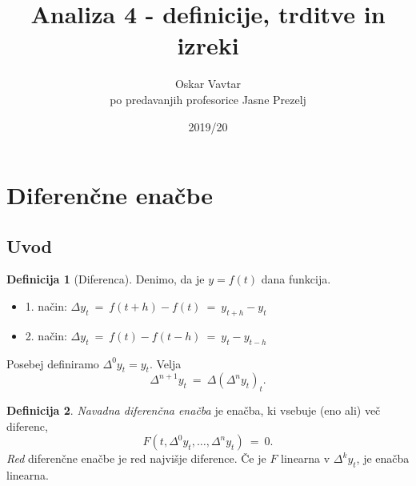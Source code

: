 \documentclass[11pt]{article}
\title{Analiza 4 - definicije, trditve in izreki}
\author{Oskar Vavtar \\
po predavanjih profesorice Jasne Prezelj}
\date{2019/20}
\newcommand{\dif}{\Delta}
\theoremstyle{definition}
\newtheorem{definicija}{Definicija}[section]
\theoremstyle{definition}
\theoremstyle{definition}
\theoremstyle{definition}
\begin{document}
\maketitle
\pagebreak
\tableofcontents
\pagebreak


\section{Diferenčne enačbe}
\vspace{0.5cm}


\subsection{Uvod}
\vspace{0.5cm}

\begin{definicija}[Diferenca]

Denimo, da je $y=f(t)$ dana funkcija.
\begin{itemize}
	\item 1. način: $\dif y_t ~=~ f(t+h) - f(t) ~=~ y_{t+h} - y_t$
	\item 2. način: $\dif y_t ~=~ f(t) - f(t-h) ~=~ y_t - y_{t-h}$
\end{itemize}
Posebej definiramo $\dif^0 y_t = y_t$. Velja
$$\dif^{n+1} y_t ~=~ \dif(\dif^n y_t)_t.$$

\end{definicija}
\vspace{0.5cm}

\begin{definicija}

\textit{Navadna diferenčna enačba} je enačba, ki vsebuje (eno ali) več diferenc,
$$F(t, \dif^0 y_t, \ldots, \dif^n y_t) ~=~ 0.$$
\textit{Red} diferenčne enačbe je red najvišje diference. Če je $F$ linearna v $\dif^k y_t$, je enačba linearna.

\end{definicija}
\vspace{0.5cm}
\end{document}
